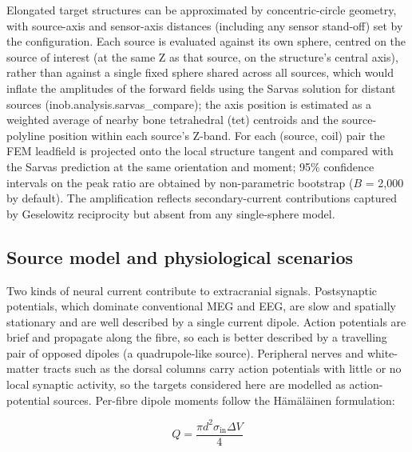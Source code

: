 \documentclass[11pt]{article}
\begin{document}
Elongated target structures can be approximated by concentric-circle
geometry, with source-axis and sensor-axis distances (including any
sensor stand-off) set by the configuration. Each source is evaluated
against its own sphere, centred on the source of interest (at the same Z
as that source, on the structure's central axis), rather
than against a single fixed sphere shared across all sources, which
would inflate the amplitudes of the forward fields using the Sarvas
solution for distant sources (inob.analysis.sarvas\_compare); the axis
position is estimated as a weighted average of nearby bone tetrahedral
(tet) centroids and the source-polyline position within each
source's Z-band. For each (source, coil) pair the FEM
leadfield is projected onto the local structure tangent and compared
with the Sarvas prediction at the same orientation and moment; 95\%
confidence intervals on the peak ratio are obtained by non-parametric
bootstrap (\(B\) = 2,000 by default). The amplification reflects
secondary-current contributions captured by Geselowitz reciprocity but
absent from any single-sphere model.

\subsection{Source model and physiological
scenarios}\label{source-model-and-physiological-scenarios}

Two kinds of neural current contribute to extracranial signals.
Postsynaptic potentials, which dominate conventional MEG and EEG, are
slow and spatially stationary and are well described by a single current
dipole. Action potentials are brief and propagate along the fibre, so
each is better described by a travelling pair of opposed dipoles (a
quadrupole-like source). Peripheral nerves and white-matter tracts such
as the dorsal columns carry action potentials with little or no local
synaptic activity, so the targets considered here are modelled as
action-potential sources. Per-fibre dipole moments follow the Hämäläinen
formulation:

\begin{equation}Q = \frac{\pi d^{2} \sigma_{\text{in}} \Delta V}{4}\tag{9}\end{equation}
\end{document}
